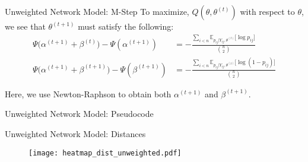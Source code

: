 \documentclass[handout]{beamer}
\begin{document}
\begin{frame}{Unweighted Network Model: M-Step}
To maximize, $Q(\theta, \theta^{(t)})$ with respect to $\theta$, we see that $\theta^{(t+1)}$ must satisfy the following:
\begin{align*}
\Psi\Big(\alpha^{(t+1)} + \beta^{(t)}\Big) - \Psi(\alpha^{(t+1)}) &= -\frac{\sum_{i<n}\mathbb{E}_{p_{ij} | Y_{ij}, \theta^{(t)}} \big[\log p_{ij}\big]}{{n \choose 2}} \tag{$\alpha_U$}\\
\Psi\Big(\alpha^{(t+1)} + \beta^{(t+1)}\Big) - \Psi(\beta^{(t+1)}) &= -\frac{\sum_{i<n}\mathbb{E}_{p_{ij} | Y_{ij}, \theta^{(t)}} \big[\log (1 - p_{ij})\big]}{{n \choose 2}} \tag{$\beta_U$}
\end{align*}

Here, we use Newton-Raphson to obtain both $\alpha^{(t+1)}$ and $\beta^{(t+1)}$.
\end{frame}

\begin{frame}{Unweighted Network Model: Pseudocode}
\begin{center}
\end{center}
\end{frame}

\begin{frame}{Unweighted Network Model: Distances}
\begin{figure}
    \centering
    \texttt{[image: heatmap\_dist\_unweighted.pdf]}
    \end{figure}
\end{frame}
\end{document}
